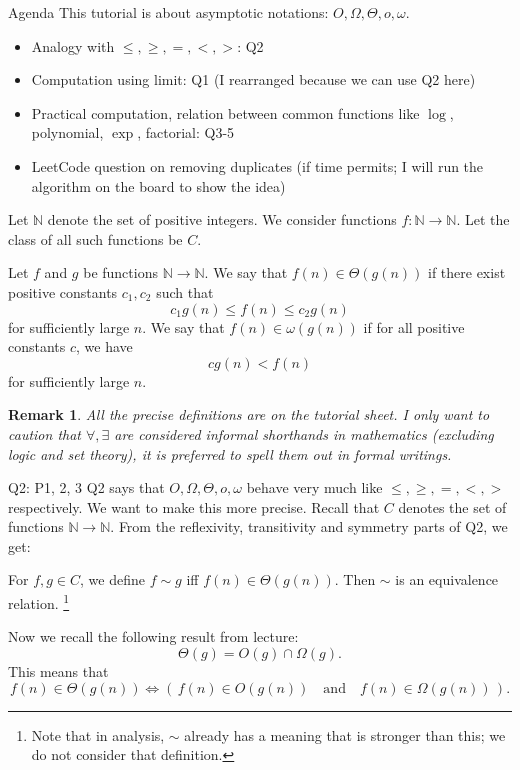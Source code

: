 \documentclass[t]{beamer}
\newtheorem{remark}{Remark}
\def\le{\leqslant}
\def\ge{\geqslant}
\def\N{\mathbb{N}}
\begin{document}
\begin{frame}{Agenda}
  This tutorial is about asymptotic notations: $O, \Omega, \Theta, o, \omega$.  
  \begin{itemize}
    \item Analogy with $\le, \ge, =, <, >$: Q2
    \item Computation using limit: Q1 (I rearranged because we can use Q2 here)
    \item Practical computation, relation between common functions like $\log$, polynomial, $\exp$, factorial: Q3-5
    \item LeetCode question on removing duplicates (if time permits; I will run the algorithm on the board to show the idea)
  \end{itemize}
\end{frame}
\begin{frame}
  Let $\N$ denote the set of positive integers. We consider functions $f: \N \to \N$. Let the class of all such functions be $C$. 
  \begin{definition}
    Let $f$ and $g$ be functions $\N \to \N$. 
    We say that $f(n) \in \Theta(g(n))$ if there exist positive constants $c_1, c_2$ such that \[c_1g(n) \le f(n) \le c_2g(n)\] for sufficiently large $n$. We say that $f(n) \in \omega(g(n))$ if for all positive constants $c$, we have
    \[cg(n)<f(n)\] for sufficiently large $n$. 
  \end{definition}
  \begin{remark}
    All the precise definitions are on the tutorial sheet. I only want to caution that $\forall, \exists$ are considered informal shorthands in mathematics (excluding logic and set theory), it is preferred to spell them out in formal writings. 
  \end{remark}
\end{frame}
\begin{frame}{Q2: P1, 2, 3}
  Q2 says that $O, \Omega, \Theta, o, \omega$ behave very much like $\le, \ge, =, <, >$ respectively. We want to make this more precise. Recall that $C$ denotes the set of functions $\N \to \N$. From the reflexivity, transitivity and symmetry parts of Q2, we get:
  \begin{theorem}
    For $f, g \in C$, we define $f\sim g$ iff $f(n) \in \Theta(g(n))$. Then $\sim$ is an equivalence relation. \footnote{Note that in analysis, $\sim$ already has a meaning that is stronger than this; we do not consider that definition. }
  \end{theorem}
  Now we recall the following result from lecture:
  \[\Theta(g) = O(g)\cap \Omega(g).\]
  This means that 
  \[ f(n) \in \Theta(g(n)) \iff \left(\,f(n) \in O(g(n)) \quad \text{and}\quad f(n) \in \Omega(g(n))\,\right).\]
\end{frame}
\end{document}

